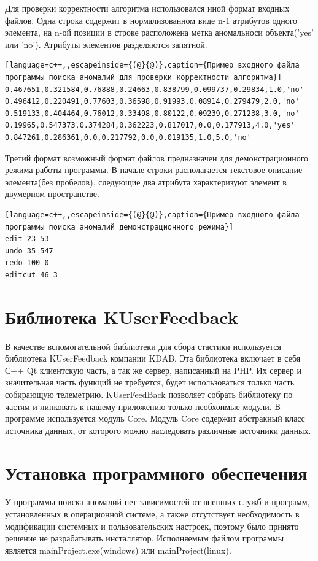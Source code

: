 Для проверки корректности алгоритма использовался иной формат входных файлов. Одна строка содержит в нормализованном виде n-1 атрибутов одного элемента, на n-ой позиции в строке расположена метка аномальноси объекта('yes' или 'no'). Атрибуты элементов разделяются запятной.
\begin{lstlisting}[language=c++,,escapeinside={(@}{@)},caption={Пример входного файла программы поиска аномалий для проверки корректности алгоритма}] 
0.467651,0.321584,0.76888,0.24663,0.838799,0.099737,0.29834,1.0,'no'
0.496412,0.220491,0.77603,0.36598,0.91993,0.08914,0.279479,2.0,'no'
0.519133,0.404464,0.76012,0.33498,0.80122,0.09239,0.271238,3.0,'no'
0.19965,0.547373,0.374284,0.362223,0.817017,0.0,0.177913,4.0,'yes'
0.847261,0.286361,0.0,0.217792,0.0,0.019135,1.0,5.0,'no'
\end{lstlisting}
Третий формат возможный формат файлов предназначен для демонстрационного режима работы программы. В начале строки располагается текстовое описание элемента(без пробелов), следующие два атрибута характеризуют элемент в двумерном пространстве.
\begin{lstlisting}[language=c++,,escapeinside={(@}{@)},caption={Пример входного файла программы поиска аномалий демонстрационного режима}] 
edit 23 53
undo 35 547
redo 100 0
editcut 46 3
\end{lstlisting}

\section{Библиотека KUserFeedback}

В качестве вспомогательной библиотеки для сбора стастики используется библиотека KUserFeedback компании KDAB. Эта библиотека включает в себя С++ Qt клиентскую часть, а так же сервер, написанный на PHP. Их сервер  и значительная часть функций не требуется, будет использоваться только часть собирающую телеметрию. KUserFeedBack позволяет  собрать библиотеку по частям и линковать к нашему приложению только необхоимые модули. В программе используется модуль Core. Модуль Core содержит абстракный класс источника данных, от которого можно наследовать различные источники данных.

\section{Установка программного обеспечения}

У программы поиска аномалий нет зависимостей от внешних служб и программ, установленных в операционной системе, а также отсутствует
необходимость в модификации системных и пользовательских настроек, поэтому было принято решение не разрабатывать инсталлятор.
Исполняемым файлом программы является mainProject.exe(windows) или mainProject(linux).

